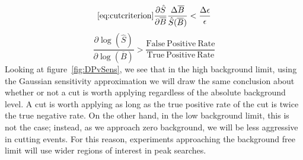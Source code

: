 \documentclass[/main.tex]{subfiles}
\begin{document}
\begin{equation} \ref{eq:cutcriterion}
  \frac{\partial\hat{S}}{\partial\overline{B}} \frac{\Delta\overline{B}}{\hat{S}(\overline{B})} < \frac{\Delta\epsilon}{\epsilon}
\end{equation}
\begin{equation}
  \frac{\partial\log(\hat{S})}{\partial\log(\overline{B})} > \frac{\mathrm{False~Positive~Rate}}{\mathrm{True~Positive~Rate}}
\end{equation}
Looking at figure~\ref{fig:DPvSens}, we see that in the high background limit, using the Gaussian sensitivity approximation we will draw the same conclusion about whether or not a cut is worth applying regardless of the absolute background level.
A cut is worth applying as long as the true positive rate of the cut is twice the true negative rate.
On the other hand, in the low background limit, this is not the case; instead, as we approach zero background, we will be less aggressive in cutting events.
For this reason, experiments approaching the background free limit will use wider regions of interest in peak searches.
\end{document}
